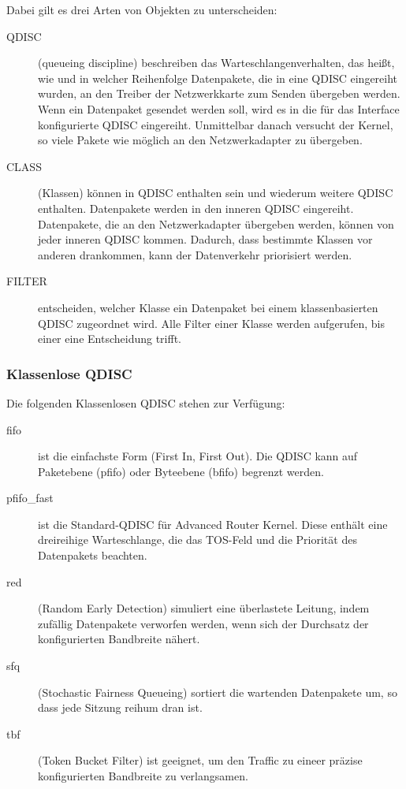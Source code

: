   Dabei gilt es drei Arten von Objekten zu unterscheiden:
  \begin{description}
    \item[QDISC] (queueing discipline) beschreiben das
      Warteschlangenverhalten, das heißt, wie und in welcher Reihenfolge
      Datenpakete, die in eine QDISC eingereiht wurden, an den Treiber der
      Netzwerkkarte zum Senden übergeben werden. Wenn ein Datenpaket gesendet
      werden soll, wird es in die für das Interface konfigurierte QDISC
      eingereiht. Unmittelbar danach versucht der Kernel, so viele Pakete wie
      möglich an den Netzwerkadapter zu übergeben.
    \item[CLASS] (Klassen) können in QDISC enthalten sein und wiederum weitere
      QDISC enthalten. Datenpakete werden in den inneren QDISC eingereiht.
      Datenpakete, die an den Netzwerkadapter übergeben werden, können
      von jeder inneren QDISC kommen. Dadurch, dass bestimmte Klassen vor
      anderen drankommen, kann der Datenverkehr priorisiert werden.
    \item[FILTER] entscheiden, welcher Klasse ein Datenpaket bei einem
      klassenbasierten QDISC zugeordnet wird. Alle Filter einer Klasse werden
      aufgerufen, bis einer eine Entscheidung trifft.
  \end{description}

  \subsubsection*{Klassenlose QDISC}
  Die folgenden Klassenlosen QDISC stehen zur Verfügung:
  \begin{description}
    \item[fifo] ist die einfachste Form (First In, First Out). Die QDISC
      kann auf Paketebene (pfifo) oder Byteebene (bfifo) begrenzt werden.
    \item[pfifo\_fast] ist die Standard-QDISC für Advanced Router Kernel. Diese
      enthält eine dreireihige Warteschlange, die das TOS-Feld und die
      Priorität des Datenpakets beachten.
    \item[red] (Random Early Detection) simuliert eine überlastete Leitung,
      indem zufällig Datenpakete verworfen werden, wenn sich der Durchsatz der
      konfigurierten Bandbreite nähert.
    \item[sfq] (Stochastic Fairness Queueing) sortiert die wartenden
      Datenpakete um, so dass jede Sitzung reihum dran ist.
    \item[tbf] (Token Bucket Filter) ist geeignet, um den Traffic zu eineer
      präzise konfigurierten Bandbreite zu verlangsamen.
  \end{description}

